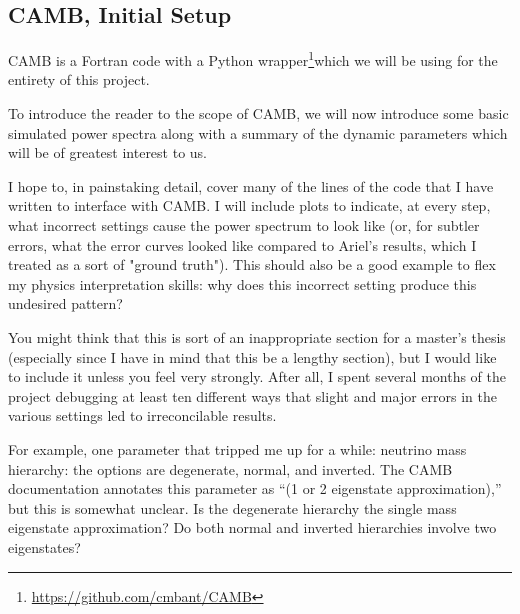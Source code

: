 \documentclass[11pt]{article}
\begin{document}
\begin{centering}
\section{CAMB, Initial Setup}
\end{centering}

CAMB is a Fortran code with a Python wrapper\footnote{
\url{https://github.com/cmbant/CAMB}
}which we will be using for the
entirety of this project.

To introduce the reader to the scope of CAMB, we will now introduce
some basic simulated power spectra along with a summary of the dynamic
parameters which will be of greatest interest to us.

I hope to, in painstaking detail, cover many of the lines of the code that I have written to interface with CAMB. I will include plots to indicate, at every step, what incorrect settings cause the power spectrum to look like (or, for subtler errors, what the error curves looked like compared to Ariel's results, which I treated as a sort of "ground truth"). This should also be a good example to flex my physics interpretation skills: why does this incorrect setting produce this undesired pattern?

You might think that this is sort of an inappropriate section for a master's thesis (especially since I have in mind that this be a lengthy section), but I would like to include it unless you feel very strongly. After all, I spent several months of the project debugging at least ten different ways that slight and major errors in the various settings led to irreconcilable results.

For example, one parameter that tripped me up for a while: neutrino mass hierarchy: the options are degenerate, normal, and inverted. The CAMB documentation annotates this parameter as ``(1 or 2 eigenstate approximation),'' but this is somewhat unclear. Is the degenerate hierarchy the single mass eigenstate approximation? Do both normal and inverted hierarchies involve two eigenstates?

\end{document}
